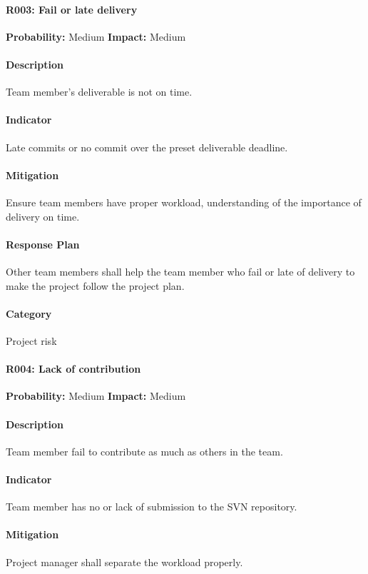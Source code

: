 \documentclass[11pt, a4paper]{report}
\begin{document}
	\paragraph{R003: Fail or late delivery} \hspace{1cm} \textbf{Probability: }Medium\hspace{1cm}   \textbf{Impact: }Medium
	\paragraph{Description}Team member's deliverable is not on time.
	\paragraph{Indicator}Late commits or no commit over the preset deliverable deadline.
	\paragraph{Mitigation}Ensure team members have proper workload, understanding of the importance of delivery on time. 
	\paragraph{Response Plan}Other team members shall help the team member who fail or late of delivery to make the project follow the project plan. \\
	\paragraph{Category} Project risk

	\paragraph{R004: Lack of contribution} \hspace{1cm} \textbf{Probability: }Medium\hspace{1cm}   \textbf{Impact: }Medium
	\paragraph{Description}Team member fail to contribute as much as others in the team.
	\paragraph{Indicator}Team member has no or lack of submission to the SVN repository. 
	\paragraph{Mitigation}Project manager shall separate the workload properly.
\end{document}
